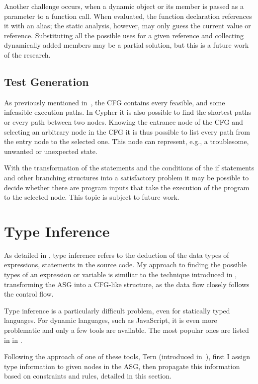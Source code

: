 Another challenge occurs, when a dynamic object or its member is passed as a parameter to a function call. When evaluated, the function declaration references it with an alias; the static analysis, however, may only guess the current value or reference. Substituting all the possible uses for a given reference and collecting dynamically added members may be a partial solution, but this is a future work of the research.

\subsection{Test Generation}
As previously mentioned in~, the CFG contains every feasible, and some infeasible execution paths. In Cypher it is also possible to find the shortest paths or every path between two nodes. Knowing the entrance node of the CFG and selecting an arbitrary node in the CFG it is thus possible to list every path from the entry node to the selected one. This node can represent, e.g., a troublesome, unwanted or unexpected state.

With the transformation of the statements and the conditions of the if statements and other branching structures into a satisfactory problem it may be possible to decide whether there are program inputs that take the execution of the program to the selected node. This topic is subject to future work.


\section{Type Inference}
As detailed in , type inference refers to the deduction of the data types of expressions, statements in the source code. My approach to finding the possible types of an expression or variable is similiar to the technique introduced in , transforming the ASG into a CFG-like structure, as the data flow closely follows the control flow.

Type inference is a particularly difficult problem, even for statically typed languages. For dynamic languages, such as JavaScript, it is even more problematic and only a few tools are available. The most popular ones are listed in in .

Following the approach of one of these tools, Tern (introduced in~), first I assign type information to given nodes in the ASG, then propagate this information based on constraints and rules, detailed in this section.

